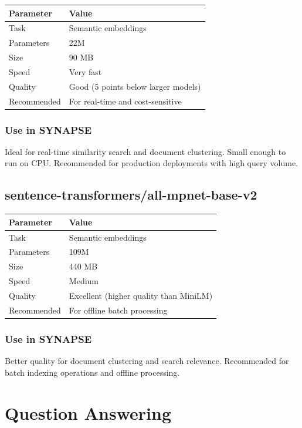 \documentclass[12pt,a4paper]{report}
\begin{document}
\begin{tabular}{|p{3cm}|p{11cm}|}
\hline
\textbf{Parameter} & \textbf{Value} \\
\hline
Task & Semantic embeddings \\
\hline
Parameters & 22M \\
\hline
Size & 90 MB \\
\hline
Speed & Very fast \\
\hline
Quality & Good (5 points below larger models) \\
\hline
Recommended & For real-time and cost-sensitive \\
\hline
\end{tabular}

\subsubsection{Use in SYNAPSE}

Ideal for real-time similarity search and document clustering. Small enough to run on CPU. Recommended for production deployments with high query volume.

\subsection{sentence-transformers/all-mpnet-base-v2}

\begin{tabular}{|p{3cm}|p{11cm}|}
\hline
\textbf{Parameter} & \textbf{Value} \\
\hline
Task & Semantic embeddings \\
\hline
Parameters & 109M \\
\hline
Size & 440 MB \\
\hline
Speed & Medium \\
\hline
Quality & Excellent (higher quality than MiniLM) \\
\hline
Recommended & For offline batch processing \\
\hline
\end{tabular}

\subsubsection{Use in SYNAPSE}

Better quality for document clustering and search relevance. Recommended for batch indexing operations and offline processing.

\section{Question Answering}
\end{document}
